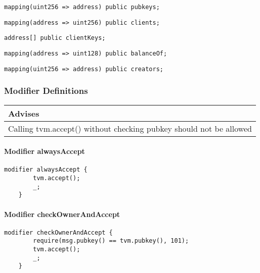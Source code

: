 \begin{lstlisting}[firstnumber=33]
	mapping(uint256 => address) public pubkeys;
\end{lstlisting}

\begin{lstlisting}[firstnumber=34]
	mapping(address => uint256) public clients;
\end{lstlisting}

\begin{lstlisting}[firstnumber=35]
	address[] public clientKeys;
\end{lstlisting}

\begin{lstlisting}[firstnumber=37]
	mapping(address => uint128) public balanceOf;
\end{lstlisting}

\begin{lstlisting}[firstnumber=38]
	mapping(uint256 => address) public creators;
\end{lstlisting}

\subsubsection{Modifier Definitions}


\ifsoldraft
\noindent\begin{tabular}{|p{12cm}|}\hline
\rowcolor{green}Advises
\\\hline
Calling tvm.accept() without checking pubkey should not be allowed
\\\hline\end{tabular}
\fi

\paragraph{Modifier alwaysAccept}


\begin{lstlisting}[firstnumber=45]
	modifier alwaysAccept {
		tvm.accept();
		_;
	}
\end{lstlisting}

\paragraph{Modifier checkOwnerAndAccept}


\begin{lstlisting}[firstnumber=51]
	modifier checkOwnerAndAccept {
		require(msg.pubkey() == tvm.pubkey(), 101);
		tvm.accept();
		_;
	}
\end{lstlisting}

